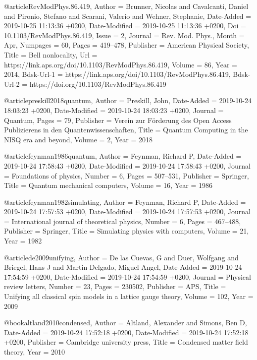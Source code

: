 \documentclass[epj,final]{svjour}
\begin{document}
@article{RevModPhys.86.419,
	Author = {Brunner, Nicolas and Cavalcanti, Daniel and Pironio, Stefano and Scarani, Valerio and Wehner, Stephanie},
	Date-Added = {2019-10-25 11:13:36 +0200},
	Date-Modified = {2019-10-25 11:13:36 +0200},
	Doi = {10.1103/RevModPhys.86.419},
	Issue = {2},
	Journal = {Rev. Mod. Phys.},
	Month = {Apr},
	Numpages = {60},
	Pages = {419--478},
	Publisher = {American Physical Society},
	Title = {Bell nonlocality},
	Url = {https://link.aps.org/doi/10.1103/RevModPhys.86.419},
	Volume = {86},
	Year = {2014},
	Bdsk-Url-1 = {https://link.aps.org/doi/10.1103/RevModPhys.86.419},
	Bdsk-Url-2 = {https://doi.org/10.1103/RevModPhys.86.419}}

@article{preskill2018quantum,
	Author = {Preskill, John},
	Date-Added = {2019-10-24 18:03:23 +0200},
	Date-Modified = {2019-10-24 18:03:23 +0200},
	Journal = {Quantum},
	Pages = {79},
	Publisher = {Verein zur F{\"o}rderung des Open Access Publizierens in den Quantenwissenschaften},
	Title = {Quantum Computing in the NISQ era and beyond},
	Volume = {2},
	Year = {2018}}

@article{feynman1986quantum,
	Author = {Feynman, Richard P},
	Date-Added = {2019-10-24 17:58:43 +0200},
	Date-Modified = {2019-10-24 17:58:43 +0200},
	Journal = {Foundations of physics},
	Number = {6},
	Pages = {507--531},
	Publisher = {Springer},
	Title = {Quantum mechanical computers},
	Volume = {16},
	Year = {1986}}

@article{feynman1982simulating,
	Author = {Feynman, Richard P},
	Date-Added = {2019-10-24 17:57:53 +0200},
	Date-Modified = {2019-10-24 17:57:53 +0200},
	Journal = {International journal of theoretical physics},
	Number = {6},
	Pages = {467--488},
	Publisher = {Springer},
	Title = {Simulating physics with computers},
	Volume = {21},
	Year = {1982}}

@article{de2009unifying,
	Author = {De las Cuevas, G and Duer, Wolfgang and Briegel, Hans J and Martin-Delgado, Miguel Angel},
	Date-Added = {2019-10-24 17:54:59 +0200},
	Date-Modified = {2019-10-24 17:54:59 +0200},
	Journal = {Physical review letters},
	Number = {23},
	Pages = {230502},
	Publisher = {APS},
	Title = {Unifying all classical spin models in a lattice gauge theory},
	Volume = {102},
	Year = {2009}}

@book{altland2010condensed,
	Author = {Altland, Alexander and Simons, Ben D},
	Date-Added = {2019-10-24 17:52:18 +0200},
	Date-Modified = {2019-10-24 17:52:18 +0200},
	Publisher = {Cambridge university press},
	Title = {Condensed matter field theory},
	Year = {2010}}
\end{document}
